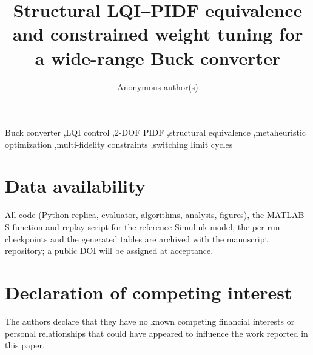 \documentclass[preprint,12pt]{elsarticle}
\begin{document}
\begin{frontmatter}
\title{Structural LQI--PIDF equivalence and constrained weight tuning for a wide-range Buck converter}

\author{Anonymous author(s)}
\address{Affiliation withheld for review}



\begin{keyword}
Buck converter \sep LQI control \sep 2-DOF PIDF \sep structural equivalence \sep metaheuristic optimization \sep multi-fidelity constraints \sep switching limit cycles
\end{keyword}
\end{frontmatter}

\linenumbers








\appendix


\section*{Data availability}
All code (Python replica, evaluator, algorithms, analysis, figures), the MATLAB
S-function and replay script for the reference Simulink model, the per-run
checkpoints and the generated tables are archived with the manuscript
repository; a public DOI will be assigned at acceptance.

\section*{Declaration of competing interest}
The authors declare that they have no known competing financial interests or
personal relationships that could have appeared to influence the work reported
in this paper.



\end{document}
